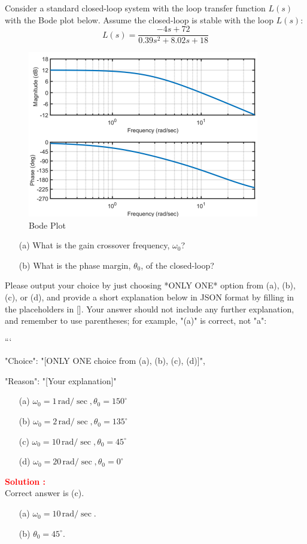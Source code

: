 \documentclass[12pt]{article}
\begin{document}
Consider a standard closed-loop system with the loop transfer function $L(s)$ with the Bode plot below.  Assume the closed-loop is stable with the loop $L(s)$:
\begin{equation*}
    L(s) = \frac{-4s+72}{0.39s^2+8.02s+18}
\end{equation*}
\begin{figure}[h]
\centering
\includegraphics[width=0.9\textwidth]{figs/6.1.png}
\caption{Bode Plot}
\end{figure}
\begin{itemize}
    \item[(a)] What is the gain crossover frequency, $\omega_0$?
    \item[(b)] What is the phase margin, $\theta_0$, of the closed-loop? 
    \end{itemize}

Please output your choice by just choosing *ONLY ONE* option from (a), (b), (c), or (d), and provide a short explanation below in JSON format by filling in the placeholders in []. Your answer should not include any further explanation, and remember to use parentheses; for example, "(a)" is correct, not "a":

```
{

"Choice": "[ONLY ONE choice from (a), (b), (c), (d)]",

"Reason": "[Your explanation]"

}

\begin{itemize}
    \item[(a)] \(\omega_0 = 1\, \text{rad}/\sec, \theta_0 = 150^{\circ}\)
    \item[(b)] \(\omega_0 = 2\, \text{rad}/\sec, \theta_0 = 135^{\circ}\)
    \item[(c)] \(\omega_0 = 10\, \text{rad}/\sec, \theta_0 = 45^{\circ}\)
    \item[(d)] \(\omega_0 = 20\, \text{rad}/\sec, \theta_0 = 0^{\circ}\)
\end{itemize}
\textbf{\textcolor{red}{Solution :}} \\
Correct answer is (c).\\
\begin{itemize}
    \item[(a)] $\omega_0 = 10\, \text{rad}/\sec.$
    \item[(b)] $\theta_0 = 45^{\circ}$.
\end{itemize}
\clearpage
\end{document}
